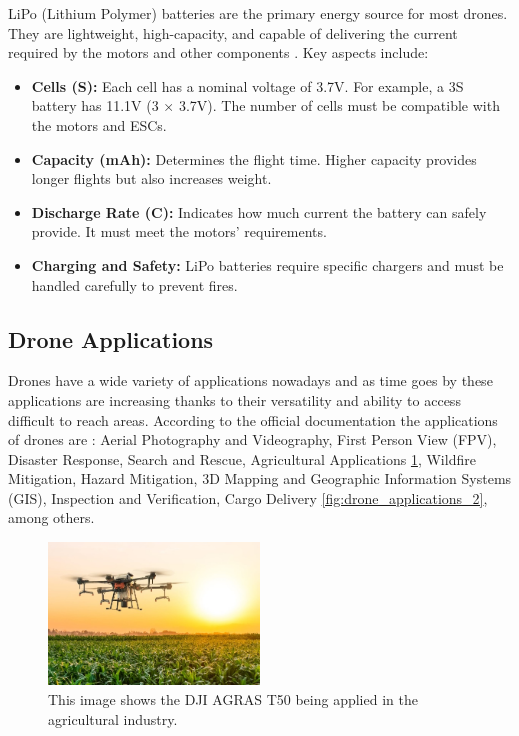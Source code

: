 LiPo (Lithium Polymer) batteries are the primary energy source for most drones. They are lightweight, high-capacity, and capable of delivering the current required by the motors and other components \cite{lipo_batteries}. Key aspects include:

\begin{itemize}
    \item \textbf{Cells (S):} Each cell has a nominal voltage of 3.7V. For example, a 3S battery has 11.1V (3 × 3.7V). The number of cells must be compatible with the motors and ESCs.
    \item \textbf{Capacity (mAh):} Determines the flight time. Higher capacity provides longer flights but also increases weight.
    \item \textbf{Discharge Rate (C):} Indicates how much current the battery can safely provide. It must meet the motors' requirements.
    \item \textbf{Charging and Safety:} LiPo batteries require specific chargers and must be handled carefully to prevent fires.
\end{itemize}

\subsection{Drone Applications}
Drones have a wide variety of applications nowadays and as time goes by these applications are increasing thanks to their versatility and ability to access difficult to reach areas. According to the official documentation \cite{ardupilot} the applications of drones are : Aerial Photography and Videography, First Person View (FPV), Disaster Response, Search and Rescue, Agricultural Applications \ref{fig:drone_applications}, Wildfire Mitigation, Hazard Mitigation, 3D Mapping and Geographic Information Systems (GIS), Inspection and Verification, Cargo Delivery \ref{fig:drone_applications_2}, among others.

\begin{figure}[H]
    \centering
    \includegraphics[width=0.5\textwidth]{pictures/drone_aplication_1.jpg}
    \caption{This image shows the DJI AGRAS T50 being applied in the agricultural industry.  \cite{aplications_drones} }
    \label{fig:drone_applications}
\end{figure}

